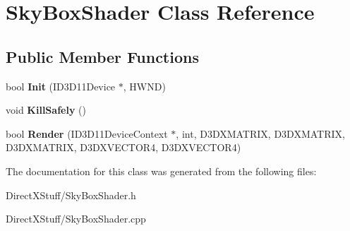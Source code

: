 \hypertarget{class_sky_box_shader}{\section{Sky\-Box\-Shader Class Reference}
\label{class_sky_box_shader}
}
\subsection*{Public Member Functions}
\begin{DoxyCompactItemize}
\item 
\hypertarget{class_sky_box_shader_adf496d825d2497a89dce9b375526c7fb}{bool {\bfseries Init} (I\-D3\-D11\-Device $\ast$, H\-W\-N\-D)}\label{class_sky_box_shader_adf496d825d2497a89dce9b375526c7fb}

\item 
\hypertarget{class_sky_box_shader_a6c5d653c742659b35767098afc703a05}{void {\bfseries Kill\-Safely} ()}\label{class_sky_box_shader_a6c5d653c742659b35767098afc703a05}

\item 
\hypertarget{class_sky_box_shader_a4647c49c8c1e147c1c2fe4a9125af32a}{bool {\bfseries Render} (I\-D3\-D11\-Device\-Context $\ast$, int, D3\-D\-X\-M\-A\-T\-R\-I\-X, D3\-D\-X\-M\-A\-T\-R\-I\-X, D3\-D\-X\-M\-A\-T\-R\-I\-X, D3\-D\-X\-V\-E\-C\-T\-O\-R4, D3\-D\-X\-V\-E\-C\-T\-O\-R4)}\label{class_sky_box_shader_a4647c49c8c1e147c1c2fe4a9125af32a}

\end{DoxyCompactItemize}


The documentation for this class was generated from the following files\-:\begin{DoxyCompactItemize}
\item 
Direct\-X\-Stuff/Sky\-Box\-Shader.\-h\item 
Direct\-X\-Stuff/Sky\-Box\-Shader.\-cpp\end{DoxyCompactItemize}
